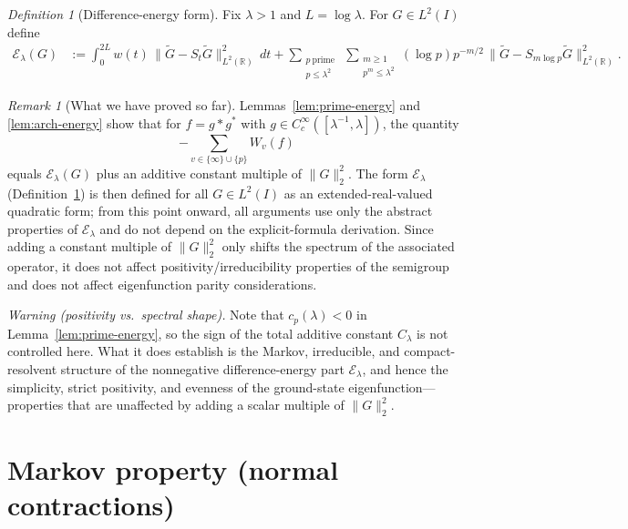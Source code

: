 \documentclass[11pt]{article}
\theoremstyle{remark}
\newtheorem{remark}[theorem]{Remark}
\newtheorem{definition}[theorem]{Definition}
\newcommand{\R}{\mathbb R}
\newcommand{\1}{\mathbf 1}
\begin{document}
\begin{definition}[Difference-energy form]
\label{def:E}
Fix $\lambda>1$ and $L=\log\lambda$. For $G\in L^2(I)$ define
\begin{align}
\mathcal E_\lambda(G)
&:=\int_{0}^{2L} w(t)\,\|\widetilde G-S_t\widetilde G\|_{L^2(\R)}^2\,dt
+\sum_{\substack{p\ \mathrm{prime}\\ p\le \lambda^2}}\ \sum_{\substack{m\ge 1\\ p^m\le \lambda^2}}
(\log p)p^{-m/2}\,\|\widetilde G-S_{m\log p}\widetilde G\|_{L^2(\R)}^2.
\end{align}
\end{definition}

\begin{remark}[What we have proved so far]
Lemmas~\ref{lem:prime-energy} and \ref{lem:arch-energy} show that for $f=g*g^*$ with
$g\in C_c^\infty([\lambda^{-1},\lambda])$, the quantity
\[
-\sum_{v\in\{\infty\}\cup\{p\}} W_v(f)
\]
equals $\mathcal E_\lambda(G)$ plus an additive constant multiple of $\|G\|_2^2$.
The form $\mathcal E_\lambda$ (Definition~\ref{def:E}) is then defined for all $G\in L^2(I)$
as an extended-real-valued quadratic form; from this point onward, all arguments use only the
abstract properties of $\mathcal E_\lambda$ and do not depend on the explicit-formula derivation.
Since adding a constant multiple of $\|G\|_2^2$ only shifts the spectrum of the associated
operator, it does not affect positivity/irreducibility properties of the semigroup and does not
affect eigenfunction parity considerations.

\medskip\noindent
\emph{Warning (positivity vs.\ spectral shape).}
Note that $c_p(\lambda)<0$ in Lemma~\ref{lem:prime-energy}, so the sign of the total additive constant $C_\lambda$ is not controlled here.
What it does establish is the Markov, irreducible, and compact-resolvent structure of the nonnegative difference-energy part $\mathcal E_\lambda$, and hence the simplicity, strict positivity, and evenness of the ground-state eigenfunction---properties that are unaffected by adding a scalar multiple of $\|G\|_2^2$.
\end{remark}

\section{Markov property (normal contractions)}
\end{document}
